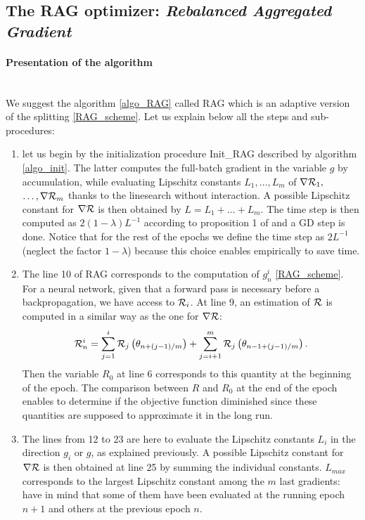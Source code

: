 \subsection{The RAG optimizer: {\it Rebalanced Aggregated Gradient}}

\paragraph{Presentation of the algorithm}
~~\\
We suggest the algorithm \ref{algo_RAG} called RAG which is an adaptive version of the splitting \eqref{RAG_scheme}. Let us explain below all the steps and sub-procedures:
\begin{enumerate}
	\item let us begin by the initialization procedure Init\_RAG described by algorithm \ref{algo_init}. The latter computes the full-batch gradient in the variable $g$ by accumulation, while evaluating Lipschitz constants $L_1, \dots, L_m$ of 
	$\nabla \mathcal{R}_1,$ $\dots, \nabla \mathcal{R}_m$ thanks to the linesearch without interaction. A possible Lipschitz constant for $\nabla \mathcal{R}$ is then obtained by $L=L_1+\dots+L_m$. The time step is then computed as $2(1-\lambda)L^{-1}$ according to proposition 1 of \cite{Lyap_Theory_Bilel} and a GD step is done. Notice that for the rest of the epochs we define the time step as $2L^{-1}$ (neglect the factor $1-\lambda$) because this choice enables empirically to save time.
	\item The line 10 of RAG corresponds to the computation of $g_n^i$ \eqref{RAG_scheme}. For a neural network, given that a forward pass is necessary before a backpropagation, we have access to $\mathcal{R}_i$. At line 9, an estimation of $\mathcal{R}$ is computed in a similar way as the one for $\nabla \mathcal{R}$:
	\begin{equation}
		\mathcal{R}_n^i = \sum_{j=1}^i \mathcal{R}_j\left(\theta_{n+(j-1)/m}\right)+\sum_{j=i+1}^m \mathcal{R}_j\left(\theta_{n-1+(j-1)/m}\right).
		\label{Rni}
	\end{equation}
	Then the variable $R_0$ at line 6 corresponds to this quantity at the beginning of the epoch. The comparison between $R$ and $R_0$ at the end of the epoch enables to determine if the objective function diminished since these quantities are supposed to approximate it in the long run. 
	\item The lines from 12 to 23 are here to evaluate the Lipschitz constants $L_i$ in the direction $g_i$ or $g$, as explained previously. A possible Lipschitz constant for $\nabla \mathcal{R}$ is then obtained at line 25 by summing the individual constants. $L_{max}$ corresponds to the largest Lipschitz constant among the $m$ last gradients: have in mind that some of them have been evaluated at the running epoch $n+1$ and others at the previous epoch $n$.

\end{enumerate}
